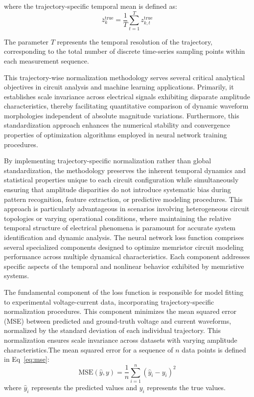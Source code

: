 \documentclass[11pt, oneside]{article}
\begin{document}
where the trajectory-specific temporal mean is defined as:
\begin{equation}
    \bar{z}_k^{\mathrm{true}} = \frac{1}{T} \sum_{t=1}^{T} z_{k,t}^{\mathrm{true}}
\end{equation}

The parameter \(T\) represents the temporal resolution of the trajectory, corresponding to the total number of discrete time-series sampling points within each measurement sequence.

This trajectory-wise normalization methodology serves several critical analytical objectives in circuit analysis and machine learning applications. Primarily, it establishes scale invariance across electrical signals exhibiting disparate amplitude characteristics, thereby facilitating quantitative comparison of dynamic waveform morphologies independent of absolute magnitude variations. Furthermore, this standardization approach enhances the numerical stability and convergence properties of optimization algorithms employed in neural network training procedures.

By implementing trajectory-specific normalization rather than global standardization, the methodology preserves the inherent temporal dynamics and statistical properties unique to each circuit configuration while simultaneously ensuring that amplitude disparities do not introduce systematic bias during pattern recognition, feature extraction, or predictive modeling procedures. This approach is particularly advantageous in scenarios involving heterogeneous circuit topologies or varying operational conditions, where maintaining the relative temporal structure of electrical phenomena is paramount for accurate system identification and dynamic analysis.
The neural network loss function comprises several specialized components designed to optimize memristor circuit modeling performance across multiple dynamical characteristics. Each component addresses specific aspects of the temporal and nonlinear behavior exhibited by memristive systems.

The fundamental component of the loss function is responsible for model fitting to experimental voltage-current data, incorporating trajectory-specific normalization procedures. This component minimizes the mean squared error (MSE) between predicted and ground-truth voltage and current waveforms, normalized by the standard deviation of each individual trajectory. This normalization ensures scale invariance across datasets with varying amplitude characteristics.The mean squared error for a sequence of \(n\) data points is defined in Eq~\eqref{eq:mse}:
\begin{equation}
    \mathrm{MSE}(\hat{y}, y) = \frac{1}{n} \sum_{i=1}^{n} (\hat{y}_i - y_i)^2
    \label{eq:mse}
\end{equation}
where \(\hat{y}_i\) represents the predicted values and \(y_i\) represents the true values.
\end{document}
